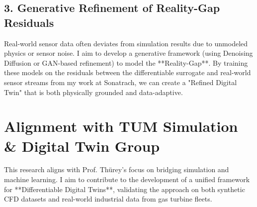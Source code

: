 \documentclass[11pt,a4paper]{article}
\begin{document}
\subsection{3. Generative Refinement of Reality-Gap Residuals}
Real-world sensor data often deviates from simulation results due to unmodeled physics or sensor noise. I aim to develop a generative framework (using Denoising Diffusion or GAN-based refinement) to model the **Reality-Gap**. By training these models on the residuals between the differentiable surrogate and real-world sensor streams from my work at Sonatrach, we can create a "Refined Digital Twin" that is both physically grounded and data-adaptive.

\section{Alignment with TUM Simulation & Digital Twin Group}
This research aligns with Prof. Thürey’s focus on bridging simulation and machine learning. I aim to contribute to the development of a unified framework for **Differentiable Digital Twins**, validating the approach on both synthetic CFD datasets and real-world industrial data from gas turbine fleets.
\end{document}
